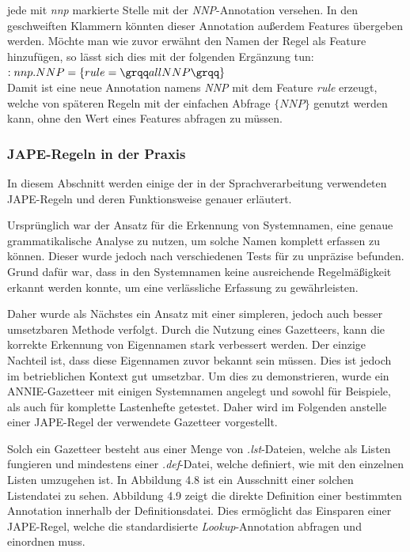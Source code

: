 \documentclass[12pt]{report}
\begin{document}
jede mit \textit{nnp} markierte Stelle mit der \textit{NNP}-Annotation versehen. In den geschweiften Klammern könnten dieser Annotation außerdem Features übergeben werden. Möchte man wie zuvor erwähnt den Namen der Regel als Feature hinzufügen, so lässt sich dies mit der folgenden Ergänzung tun:\\

$:nnp.NNP=\{rule=\grqq allNNP\grqq \}$\\

Damit ist eine neue Annotation namens \textit{NNP} mit dem Feature \textit{rule} erzeugt, welche von späteren Regeln mit der einfachen Abfrage $\{NNP\}$ genutzt werden kann, ohne den Wert eines Features abfragen zu müssen.

\subsubsection{JAPE-Regeln in der Praxis}
In diesem Abschnitt werden einige der in der Sprachverarbeitung verwendeten JAPE-Regeln und deren Funktionsweise genauer erläutert. 

Ursprünglich war der Ansatz für die Erkennung von Systemnamen, eine genaue grammatikalische Analyse zu nutzen, um solche Namen komplett erfassen zu können. Dieser wurde jedoch nach verschiedenen Tests für zu unpräzise befunden. Grund dafür war, dass in den Systemnamen keine ausreichende Regelmäßigkeit erkannt werden konnte, um eine verlässliche Erfassung zu gewährleisten. 

Daher wurde als Nächstes ein Ansatz mit einer simpleren, jedoch auch besser umsetzbaren Methode verfolgt. Durch die Nutzung eines Gazetteers, kann die korrekte Erkennung von Eigennamen stark verbessert werden. Der einzige Nachteil ist, dass diese Eigennamen zuvor bekannt sein müssen. Dies ist jedoch im betrieblichen Kontext gut umsetzbar. Um dies zu demonstrieren, wurde ein ANNIE-Gazetteer mit einigen Systemnamen angelegt und sowohl für Beispiele, als auch für komplette Lastenhefte getestet. Daher wird im Folgenden anstelle einer JAPE-Regel der verwendete Gazetteer vorgestellt. 

Solch ein Gazetteer besteht aus einer Menge von \textit{.lst}-Dateien, welche als Listen fungieren und mindestens einer \textit{.def}-Datei, welche definiert, wie mit den einzelnen Listen umzugehen ist. In Abbildung 4.8 ist ein Ausschnitt einer solchen Listendatei zu sehen. Abbildung 4.9 zeigt die direkte Definition einer bestimmten Annotation innerhalb der Definitionsdatei. Dies ermöglicht das Einsparen einer JAPE-Regel, welche die standardisierte \textit{Lookup}-Annotation abfragen und einordnen muss.
\end{document}
